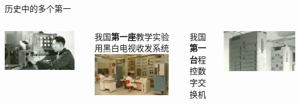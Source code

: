 \documentclass[aspectratio=169, utf8, fontset=windows]{beamer}
\begin{document}
\begin{frame}{历史中的多个第一}
    \begin{columns}
        \centering
        \scriptsize
        \includegraphics[width=0.9\textwidth]{./resources/3.jpg}

        我国\textcolor{Fore}{\textbf{第一座}}教学实验用黑白电视收发系统\\[1em]

        \includegraphics[width=0.9\textwidth]{./resources/4.jpg}

        我国\textcolor{Fore}{\textbf{第一台}}程控数字交换机

        \centering
        \scriptsize
        \includegraphics[width=0.9\textwidth]{./resources/5.jpg}


\end{columns}
\end{frame}
\end{document}
